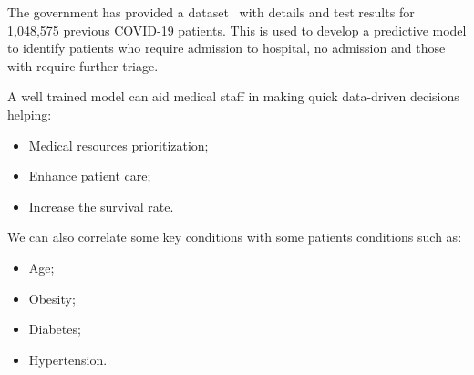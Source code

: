 The government has provided a dataset~\parencite[]{2023:NizMei} with details and test results for 
1,048,575 previous COVID-19 patients. This is used to develop a predictive model to identify 
patients who require admission to hospital, no admission and those with require further triage.

A well trained model can aid medical staff in making quick data-driven decisions helping:
 \begin{itemize}
     \item Medical resources prioritization;
     \item Enhance patient care;
     \item Increase the survival rate.
 \end{itemize}
We can also correlate some key conditions with some patients conditions such as:
 \begin{itemize}
     \item Age;
     \item Obesity;
     \item Diabetes;
     \item Hypertension.
 \end{itemize}
 